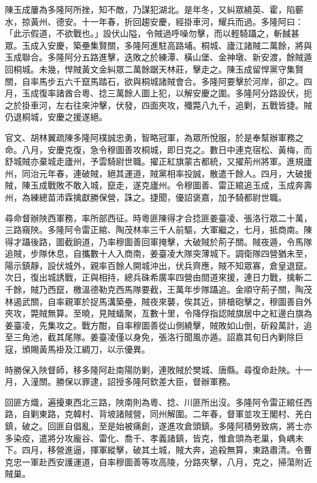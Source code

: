 \begin{pinyinscope}
陳玉成屢為多隆阿所挫，知不敵，乃謀犯湖北。是年冬，又糾眾繞英、霍，陷蘄水，掠黃州、德安。十一年春，折回趨安慶，經掛車河，耀兵而過。多隆阿曰：「此示假道，不欲戰也。」設伏山隘，令賊過呼噪勿擊，而以輕騎躡之，斬馘甚眾。玉成入安慶，築壘集賢關，多隆阿進駐高路埔。桐城、廬江諸賊二萬餘，將與玉成聯合。多隆阿分五路進擊，迭敗之於練潭、橫山堡、金神墩、新安渡，餘賊遁回桐城。未幾，悍賊黃文金糾眾二萬餘踞天林莊，擊走之。陳玉成留悍黨守集賢關，自率馬步五六千竄馬踏石，欲與桐城諸賊會合。多隆阿要擊於河岸，卻之。四月，玉成復率諸酋合粵、捻三萬餘人圖上犯，以解安慶之圍。多隆阿分路設伏，扼之於掛車河，左右往來沖擊，伏發，四面夾攻，殲斃八九千，追剿，五戰皆捷。賊仍退桐城，安慶之援遂絕。

官文、胡林翼疏陳多隆阿樸誠忠勇，智略冠軍，為眾所悅服，於是奉幫辦軍務之命。八月，安慶克復，急令穆圖善攻桐城，即日克之。數日中連克宿松、黃梅，而舒城賊亦棄城走廬州，予雲騎尉世職。擢正紅旗蒙古都統，又擢荊州將軍。進規廬州，同治元年春，連破賊，絕其運道，賊黨相率投誠，散遣千餘人。四月，大破援賊，陳玉成戰敗不敢入城，竄走，遂克廬州。令穆圖善、雷正綰追玉成，玉成奔壽州，為練總苗沛霖擒獻勝保營，誅之。捷聞，優詔褒嘉，加予騎都尉世職。

尋命督辦陜西軍務，率所部西征。時粵匪陳得才合捻匪姜臺凌、張洛行眾二十萬，三路窺陜。多隆阿令雷正綰、陶茂林率三千人前驅，大軍繼之，七月，抵商南。陳得才躡後路，圖截餉道，乃率穆圖善回軍掩擊，大破賊於荊子關。賊夜遁，令馬隊追賊，步隊休息，自攜數十人入商南，姜臺凌大隊突薄城下。調衛隊四營猶未至，陽示鎮靜，設伏城外，親率百餘人開城沖出，伏兵齊應，賊不知眾寡，倉皇退竄。次日，復出城誘戰，正與相持，總兵硃希廣率四營由間道來援，連日力戰，擒斬二千餘，賊乃西竄，檄溫德勒克西馬隊要截，王萬年步隊躡追。金順守荊子關，陶茂林遏武關，自率親軍於捉馬溝築壘，賊夜來襲，俟其近，排槍砲擊之，穆圖善自外夾攻，斃賊無算。至曉，見賊蟻聚，亙數十里，令降俘指認賊旗居中之紅邊白旗為姜臺凌，先集攻之。戰方酣，自率穆圖善從山側繞擊，賊敗如山倒，斫殺萬計，追至三角池，截其尾隊。姜臺凌僅以身免，張洛行聞風亦遁。詔嘉其旬日內剿除巨寇，頒賜黃馬褂及江綢刀，以示優異。

時勝保入陜督師，移多隆阿赴南陽防剿，連敗賊於樊城、唐縣。尋復命赴陜。十一月，入潼關。勝保以罪逮，詔授多隆阿欽差大臣，督辦軍務。

回匪方熾，遍擾東西北三路，陜南則為粵、捻、川匪所出沒。多隆阿令雷正綰任西路，自剿東路，克韓村、背坡諸賊營，同州解圍。二年春，督軍並攻王閣村、羌白鎮，破之。回匪自倡亂，至是始被痛創，遂進攻倉頭鎮。多隆阿積勞致病，將士亦多染疫，遣將分攻龐谷、雷化、喬千、孝義諸鎮，皆克，惟倉頭為老巢，負嵎未下。四月，移營進逼，揮軍縱擊，破其土城，賊大奔，追殺無算，東路肅清。令曹克忠一軍赴西安護運道，自率穆圖善等攻高陵，分路夾擊，八月，克之，掃蕩附近賊巢。


\end{pinyinscope}

